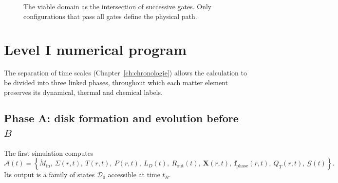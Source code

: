 \documentclass[11pt,a4paper,openany]{report}
\begin{document}

\begin{figure}[htbp]
\centering
{}
\caption{The viable domain as the intersection of successive gates. Only configurations that pass
all gates define the physical path.}
\label{fig:portes}
\end{figure}

\chapter{Level I numerical program}
\label{ch:programme}

The separation of time scales (Chapter~\ref{ch:chronologie}) allows the calculation to be divided
into three linked phases, throughout which each matter element preserves its dynamical, thermal and
chemical labels.

\section{Phase A: disk formation and evolution before \texorpdfstring{$B$}{B}}

The first simulation computes
\begin{equation}
\mathcal{A}(t)=\left\{\dot M_{\mathrm{in}},\ \Sigma(r,t),\ T(r,t),\ P(r,t),\ L_D(t),\
R_{\mathrm{out}}(t),\ \mathbf{X}(r,t),\ \mathbf{f}_{\mathrm{phase}}(r,t),\ Q_T(r,t),\ \mathcal{G}(t)\right\}.
\label{eq:phaseA}
\end{equation}
Its output is a family of states $\mathcal{D}_0$ accessible at time $t_B$.
\end{document}
